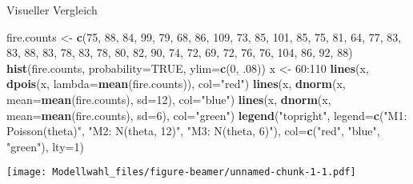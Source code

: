 \documentclass[ignorenonframetext,]{beamer}
\newenvironment{Shaded}{\begin{snugshade}}{\end{snugshade}}
\newcommand{\KeywordTok}[1]{\textcolor[rgb]{0.13,0.29,0.53}{\textbf{{#1}}}}
\newcommand{\DataTypeTok}[1]{\textcolor[rgb]{0.13,0.29,0.53}{{#1}}}
\newcommand{\DecValTok}[1]{\textcolor[rgb]{0.00,0.00,0.81}{{#1}}}
\newcommand{\StringTok}[1]{\textcolor[rgb]{0.31,0.60,0.02}{{#1}}}
\newcommand{\OtherTok}[1]{\textcolor[rgb]{0.56,0.35,0.01}{{#1}}}
\newcommand{\NormalTok}[1]{{#1}}
\begin{document}
\begin{frame}[fragile]{Visueller Vergleich}

\begin{Shaded}
\begin{Highlighting}[]
\NormalTok{fire.counts <-}\StringTok{ }\KeywordTok{c}\NormalTok{(}\DecValTok{75}\NormalTok{, }\DecValTok{88}\NormalTok{, }\DecValTok{84}\NormalTok{, }\DecValTok{99}\NormalTok{, }\DecValTok{79}\NormalTok{, }\DecValTok{68}\NormalTok{, }\DecValTok{86}\NormalTok{, }\DecValTok{109}\NormalTok{, }\DecValTok{73}\NormalTok{, }\DecValTok{85}\NormalTok{, }\DecValTok{101}\NormalTok{, }\DecValTok{85}\NormalTok{,}
                 \DecValTok{75}\NormalTok{, }\DecValTok{81}\NormalTok{, }\DecValTok{64}\NormalTok{, }\DecValTok{77}\NormalTok{, }\DecValTok{83}\NormalTok{, }\DecValTok{83}\NormalTok{, }\DecValTok{88}\NormalTok{, }\DecValTok{83}\NormalTok{, }\DecValTok{78}\NormalTok{, }\DecValTok{83}\NormalTok{, }\DecValTok{78}\NormalTok{, }\DecValTok{80}\NormalTok{,}
                 \DecValTok{82}\NormalTok{, }\DecValTok{90}\NormalTok{, }\DecValTok{74}\NormalTok{, }\DecValTok{72}\NormalTok{, }\DecValTok{69}\NormalTok{, }\DecValTok{72}\NormalTok{, }\DecValTok{76}\NormalTok{, }\DecValTok{76}\NormalTok{, }\DecValTok{104}\NormalTok{, }\DecValTok{86}\NormalTok{, }\DecValTok{92}\NormalTok{, }\DecValTok{88}\NormalTok{)}
\KeywordTok{hist}\NormalTok{(fire.counts, }\DataTypeTok{probability=}\OtherTok{TRUE}\NormalTok{, }\DataTypeTok{ylim=}\KeywordTok{c}\NormalTok{(}\DecValTok{0}\NormalTok{, .}\DecValTok{08}\NormalTok{))}
\NormalTok{x <-}\StringTok{ }\DecValTok{60}\NormalTok{:}\DecValTok{110}
\KeywordTok{lines}\NormalTok{(x, }\KeywordTok{dpois}\NormalTok{(x, }\DataTypeTok{lambda=}\KeywordTok{mean}\NormalTok{(fire.counts)), }\DataTypeTok{col=}\StringTok{"red"}\NormalTok{)}
\KeywordTok{lines}\NormalTok{(x, }\KeywordTok{dnorm}\NormalTok{(x, }\DataTypeTok{mean=}\KeywordTok{mean}\NormalTok{(fire.counts), }\DataTypeTok{sd=}\DecValTok{12}\NormalTok{), }\DataTypeTok{col=}\StringTok{"blue"}\NormalTok{)}
\KeywordTok{lines}\NormalTok{(x, }\KeywordTok{dnorm}\NormalTok{(x, }\DataTypeTok{mean=}\KeywordTok{mean}\NormalTok{(fire.counts), }\DataTypeTok{sd=}\DecValTok{6}\NormalTok{), }\DataTypeTok{col=}\StringTok{"green"}\NormalTok{)}
\KeywordTok{legend}\NormalTok{(}\StringTok{"topright"}\NormalTok{, }\DataTypeTok{legend=}\KeywordTok{c}\NormalTok{(}\StringTok{"M1: Poisson(theta)"}\NormalTok{,}
                            \StringTok{"M2: N(theta, 12)"}\NormalTok{,}
                            \StringTok{"M3: N(theta, 6)"}\NormalTok{),}
       \DataTypeTok{col=}\KeywordTok{c}\NormalTok{(}\StringTok{"red"}\NormalTok{, }\StringTok{"blue"}\NormalTok{, }\StringTok{"green"}\NormalTok{), }\DataTypeTok{lty=}\DecValTok{1}\NormalTok{)}
\end{Highlighting}
\end{Shaded}

\texttt{[image: Modellwahl\_files/figure-beamer/unnamed-chunk-1-1.pdf]}

\end{frame}
\end{document}
